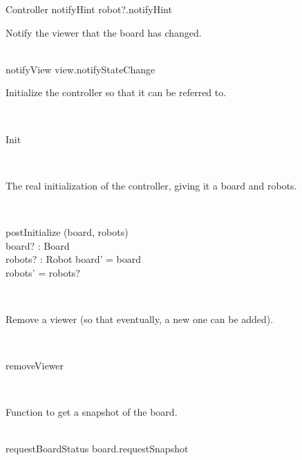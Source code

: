 \begin{class}{Controller}
notifyHint \sdef robot?.notifyHint \\
\begin{classcom}
Notify the viewer that the board has changed.
\end{classcom} \\
notifyView \sdef view.notifyStateChange
\znewpage
\begin{classcom}
Initialize the controller so that it can be referred to.
\end{classcom} \\
\begin{schema}{Init}
\end{schema}\\
\begin{classcom}
The real initialization of the controller, giving it a board and robots.
\end{classcom} \\
\begin{schema}{postInitialize}
\Delta (board, robots) \\
board? : Board \\
robots? : \power Robot
\where
board' = board \\
robots' = robots?
\end{schema}\\
\begin{classcom}
Remove a viewer (so that eventually, a new one can be added).
\end{classcom} \\
\begin{schema}{removeViewer}
\end{schema}\\
\begin{classcom}
Function to get a snapshot of the board.
\end{classcom} \\
requestBoardStatus \sdef board.requestSnapshot
\end{class}
